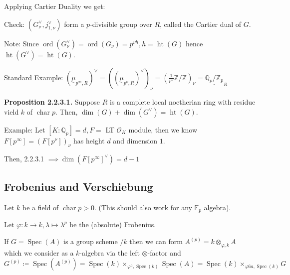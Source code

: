 \documentclass{article}
\theoremstyle{definition}
\numberwithin{theorem}{subsection}
\begin{document}
    Applying Cartier Duality we get:

    \begin{center}
    \end{center}

    Check: \((G_\nu^\vee, j_{1,\nu}^\vee)\) form a \(p\)-divisible group over \(R\), called the Cartier dual of \(G\).

    Note: Since \(\operatorname{ord}(G_\nu^\vee) = \operatorname{ord}(G_\nu) = p^{\nu h}, h = \operatorname{ht}(G)\) hence \(\operatorname{ht}(G^\vee) = \operatorname{ht}(G)\).
    
    Standard Example: \(\left( \underline{\mu}_{p^{\infty} , R} \right)^\vee = \left( \left( \underline{\mu}_{p^\nu, R} \right) ^\vee \right) _\nu = \left( \frac{1}{p^\nu} \mathbb{Z} / \mathbb{Z} \right)_\nu = \underline{\mathbb{Q}_p / \mathbb{Z}_p}_R\)  

    \textbf{Proposition 2.2.3.1.} Suppose \(R\) is a complete local noetherian ring with residue vield \(k\) of \(\operatorname{char} p\). Then, \(\dim(G) + \dim(G^\vee) = \operatorname{ht}(G)\).
    
    Example: Let \([K:\mathbb{Q}_p] = d, F =\) LT \(\mathcal{O}_K\) module, then we know \(F[p^{\infty}] = \left( F[p^\nu] \right)_\nu\)  has height \(d\) and dimension \(1\).

    Then, 2.2.3.1 \(\implies \dim \left( F[p^{\infty}]^\vee \right) = d-1\) 

    \subsection{Frobenius and Verschiebung}

    Let \(k\) be a field of \(\operatorname{char} p > 0\). (This should also work for any \(\mathbb{F}_p\) algebra).

    Let \(\varphi : k \to k, \lambda \mapsto \lambda^p\) be the (absolute) Frobenius.

    If \(G = \operatorname{Spec}(A)\) is a group scheme \(/ k\) then we can form \(A^{(p)} = k \otimes_{\varphi , k} A\) which we consider as a \(k\)-algebra via the left \(\otimes\)-factor and \(G^{(p)} \coloneqq \operatorname{Spec}(A^{(p)}) = \operatorname{Spec}(k) \times_{\varphi^a, \operatorname{Spec}(k)} \operatorname{Spec}(A) = \operatorname{Spec}(k) \times_{\varphi6a, \operatorname{Spec}(k)} G \)
    
\end{document}
